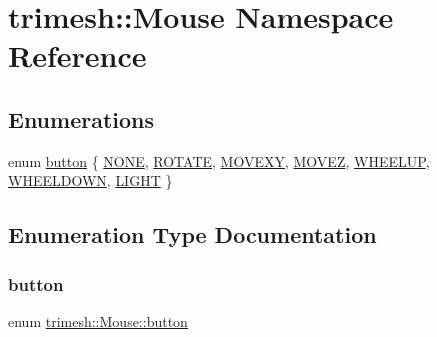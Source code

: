 \hypertarget{namespacetrimesh_1_1Mouse}{}\section{trimesh\+:\+:Mouse Namespace Reference}
\label{namespacetrimesh_1_1Mouse}
\subsection*{Enumerations}
\begin{DoxyCompactItemize}
\item 
enum \hyperlink{namespacetrimesh_1_1Mouse_a0b9f7f2e8a91299850fa63a8c995b02a}{button} \{ \newline
\hyperlink{namespacetrimesh_1_1Mouse_a0b9f7f2e8a91299850fa63a8c995b02aaa5edfc361f15c51fc39e4cbe2007f0ad}{N\+O\+NE}, 
\hyperlink{namespacetrimesh_1_1Mouse_a0b9f7f2e8a91299850fa63a8c995b02aa6a926efd1152b48129469a24c113003b}{R\+O\+T\+A\+TE}, 
\hyperlink{namespacetrimesh_1_1Mouse_a0b9f7f2e8a91299850fa63a8c995b02aa8f55c6bb0908e3de3029a4e15bf02bad}{M\+O\+V\+E\+XY}, 
\hyperlink{namespacetrimesh_1_1Mouse_a0b9f7f2e8a91299850fa63a8c995b02aa5bed59441655f866807b1693e8adfef8}{M\+O\+V\+EZ}, 
\newline
\hyperlink{namespacetrimesh_1_1Mouse_a0b9f7f2e8a91299850fa63a8c995b02aad751890cecf25b78300b91bf6ca1204d}{W\+H\+E\+E\+L\+UP}, 
\hyperlink{namespacetrimesh_1_1Mouse_a0b9f7f2e8a91299850fa63a8c995b02aa70cef609280fffef18ccae473486b8af}{W\+H\+E\+E\+L\+D\+O\+WN}, 
\hyperlink{namespacetrimesh_1_1Mouse_a0b9f7f2e8a91299850fa63a8c995b02aa16652cd39964048e2035ec3f4a365356}{L\+I\+G\+HT}
 \}
\end{DoxyCompactItemize}


\subsection{Enumeration Type Documentation}
\mbox{\label{namespacetrimesh_1_1Mouse_a0b9f7f2e8a91299850fa63a8c995b02a}} 
\subsubsection{\texorpdfstring{button}{button}}
{\footnotesize\ttfamily enum \hyperlink{namespacetrimesh_1_1Mouse_a0b9f7f2e8a91299850fa63a8c995b02a}{trimesh\+::\+Mouse\+::button}}

